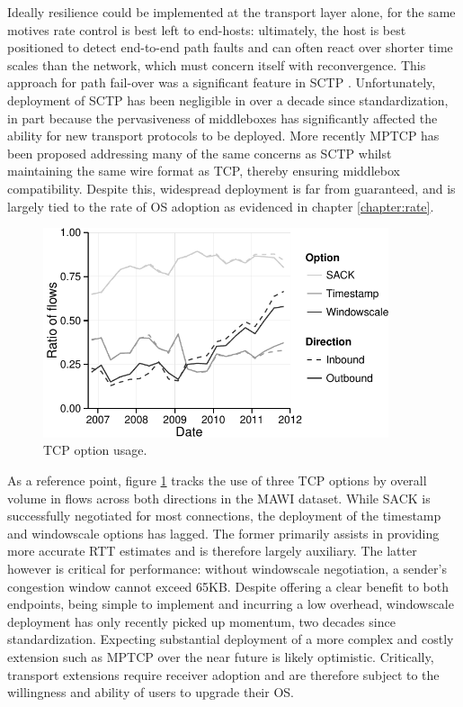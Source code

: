 Ideally resilience could be implemented at the transport layer alone, for the same motives rate control is best left to end-hosts: ultimately, the host is best positioned to detect end-to-end path faults and can often react over shorter time scales than the network, which must concern itself with reconvergence.
This approach for path fail-over was a significant feature in \ac{SCTP} \cite{rfc4960}.
Unfortunately, deployment of \ac{SCTP} has been negligible in over a decade since standardization, in part because the pervasiveness of middleboxes has significantly affected the ability for new transport protocols to be deployed.
More recently \ac{MPTCP} has been proposed addressing many of the same concerns as \ac{SCTP} whilst maintaining the same wire format as \ac{TCP}, thereby ensuring middlebox compatibility.
Despite this, widespread deployment is far from guaranteed, and is largely tied to the rate of \ac{OS} adoption as evidenced in chapter \ref{chapter:rate}.

\begin{figure}[t]
    \centering
    \includegraphics[width=4.0in]{figures/inflex/options}
    \caption{\acs{TCP} option usage.\label{fig:wscale}}
    \hfill
\end{figure}

As a reference point, figure \ref{fig:wscale} tracks the use of three \ac{TCP} options by overall volume in flows across both directions in the \ac{MAWI} dataset.
While \ac{SACK} is successfully negotiated for most connections, the deployment of the timestamp and windowscale options has lagged.
The former primarily assists in providing more accurate \ac{RTT} estimates and is therefore largely auxiliary.
The latter however is critical for performance: without windowscale negotiation, a sender's congestion window cannot exceed 65KB.
Despite offering a clear benefit to both endpoints, being simple to implement and incurring a low overhead, windowscale deployment has only recently picked up momentum, two decades since standardization.
Expecting substantial deployment of a more complex and costly extension such as \ac{MPTCP} over the near future is likely optimistic.
Critically, transport extensions require receiver adoption and are therefore subject to the willingness and ability of users to upgrade their OS.

